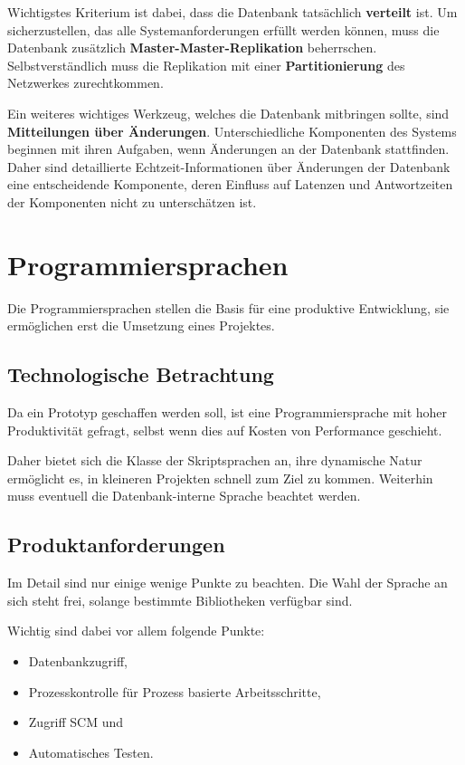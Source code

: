 Wichtigstes Kriterium ist dabei, dass die Datenbank tats\"achlich \textbf{verteilt} ist.
Um sicherzustellen, das alle Systemanforderungen erf\"ullt werden k\"onnen,
muss die Datenbank zus\"atzlich \textbf{Master-Master-Replikation} beherrschen.
Selbstverst\"andlich muss die Replikation mit einer \textbf{Partitionierung} des Netzwerkes zurechtkommen.

Ein weiteres wichtiges Werkzeug, welches die Datenbank mitbringen sollte, sind \textbf{Mitteilungen über Änderungen}.
Unterschiedliche Komponenten des Systems beginnen mit ihren Aufgaben,
wenn Änderungen an der Datenbank stattfinden.
Daher sind detaillierte Echtzeit-Informationen über Änderungen der Datenbank eine entscheidende Komponente,
deren Einfluss auf Latenzen und Antwortzeiten der Komponenten nicht zu unterschätzen ist.


\section{Programmiersprachen}

Die Programmiersprachen stellen die Basis f\"ur eine produktive Entwicklung,
sie erm\"oglichen erst die Umsetzung eines Projektes.

\subsection{Technologische Betrachtung}

Da ein Prototyp geschaffen werden soll,
ist eine Programmiersprache mit hoher Produktivit\"at gefragt,
selbst wenn dies auf Kosten von Performance geschieht.

Daher bietet sich die Klasse der Skriptsprachen an,
ihre dynamische Natur ermöglicht es,
in kleineren Projekten schnell zum Ziel zu kommen.
Weiterhin muss eventuell die Datenbank-interne Sprache beachtet werden.


\subsection{Produktanforderungen}

Im Detail sind nur einige wenige Punkte zu beachten.
Die Wahl der Sprache an sich steht frei,
solange bestimmte Bibliotheken verf\"ugbar sind.

Wichtig sind dabei vor allem folgende Punkte:
\begin{itemize}
    \item Datenbankzugriff,
    \item Prozesskontrolle für Prozess basierte Arbeitsschritte,
    \item Zugriff SCM und
    \item Automatisches Testen.
\end{itemize}

